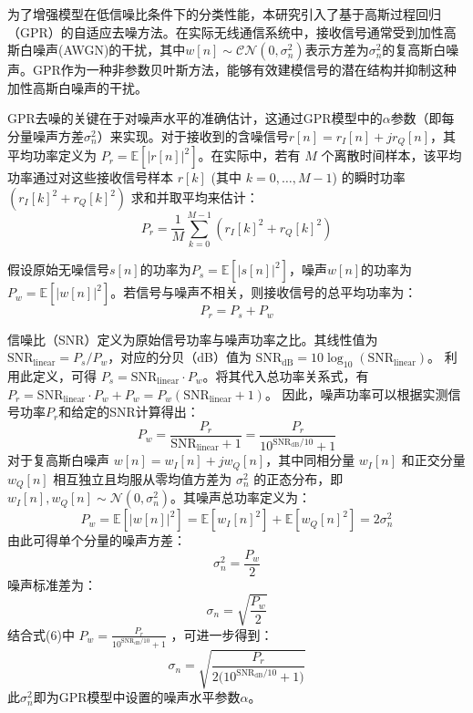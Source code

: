 \documentclass[conference]{IEEEtran}
\begin{document}
为了增强模型在低信噪比条件下的分类性能，本研究引入了基于高斯过程回归（GPR）的自适应去噪方法。在实际无线通信系统中，接收信号通常受到加性高斯白噪声(AWGN)的干扰，其中$w[n] \sim \mathcal{CN}(0, \sigma_n^2)$表示方差为$\sigma_n^2$的复高斯白噪声。GPR作为一种非参数贝叶斯方法，能够有效建模信号的潜在结构并抑制这种加性高斯白噪声的干扰。

GPR去噪的关键在于对噪声水平的准确估计，这通过GPR模型中的$\alpha$参数（即每分量噪声方差$\sigma_n^2$）来实现。对于接收到的含噪信号$r[n]=r_I[n]+jr_Q[n]$，其平均功率定义为 $P_r = \mathbb{E}[|r[n]|^2]$。在实际中，若有 $M$ 个离散时间样本，该平均功率通过对这些接收信号样本 $r[k]$ (其中 $k=0, \ldots, M-1$) 的瞬时功率 $(r_I[k]^2 + r_Q[k]^2)$ 求和并取平均来估计：
\begin{equation}
P_r = \frac{1}{M}\sum_{k=0}^{M-1}(r_I[k]^2+r_Q[k]^2)
\end{equation}

假设原始无噪信号$s[n]$的功率为$P_s = \mathbb{E}[|s[n]|^2]$，噪声$w[n]$的功率为$P_w = \mathbb{E}[|w[n]|^2]$。若信号与噪声不相关，则接收信号的总平均功率为：
\begin{equation}
P_r = P_s + P_w
\end{equation}

信噪比（SNR）定义为原始信号功率与噪声功率之比。其线性值为$\mathrm{SNR}_{\text{linear}} = P_s/P_w$，对应的分贝（dB）值为 $\mathrm{SNR}_{\text{dB}} = 10\log_{10}(\mathrm{SNR}_{\text{linear}})$。
利用此定义，可得 $P_s = \mathrm{SNR}_{\text{linear}} \cdot P_w$。将其代入总功率关系式，有 $P_r = \mathrm{SNR}_{\text{linear}} \cdot P_w + P_w = P_w(\mathrm{SNR}_{\text{linear}} + 1)$。
因此，噪声功率可以根据实测信号功率$P_r$和给定的SNR计算得出：
\begin{equation}
P_w = \frac{P_r}{\mathrm{SNR}_{\text{linear}} + 1} = \frac{P_r}{10^{\mathrm{SNR}_{\text{dB}}/10} + 1}
\end{equation}
对于复高斯白噪声 $w[n]=w_I[n]+jw_Q[n]$，其中同相分量 $w_I[n]$ 和正交分量 $w_Q[n]$ 相互独立且均服从零均值方差为 $\sigma_n^2$ 的正态分布，即 $w_I[n],w_Q[n]\sim\mathcal{N}(0,\sigma_n^2)$。其噪声总功率定义为：
\begin{equation}
P_w=\mathbb{E}[|w[n]|^2]
=\mathbb{E}[w_I[n]^2]+\mathbb{E}[w_Q[n]^2]
=2\sigma_n^2
\end{equation}
由此可得单个分量的噪声方差：
\begin{equation}
\sigma_n^2=\frac{P_w}{2}
\end{equation}
噪声标准差为：
\begin{equation}
\sigma_n=\sqrt{\frac{P_w}{2}}
\end{equation}
结合式(6)中 $P_w=\frac{P_r}{10^{\mathrm{SNR}_{\mathrm{dB}}/10}+1}$ ，可进一步得到：
\begin{equation}
\sigma_n=\sqrt{\frac{P_r}{2\bigl(10^{\mathrm{SNR}_{\mathrm{dB}}/10}+1\bigr)}}
\end{equation}
\label{eq:sigma_n_calc}
此$\sigma_n^2$即为GPR模型中设置的噪声水平参数$\alpha$。
\end{document}
